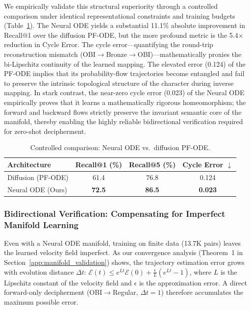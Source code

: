 \documentclass{article}
\begin{document}
We empirically validate this structural superiority through a controlled comparison under identical representational constraints and training budgets (Table~\ref{tab:pre:ode_comp}). The Neural ODE yields a substantial 11.1\% absolute improvement in Recall@1 over the diffusion PF-ODE, but the more profound metric is the 5.4$\times$ reduction in Cycle Error. The cycle error—quantifying the round-trip reconstruction mismatch (OBI$\to$Bronze$\to$OBI)—mathematically proxies the bi-Lipschitz continuity of the learned mapping. The elevated error (0.124) of the PF-ODE implies that its probability-flow trajectories become entangled and fail to preserve the intrinsic topological structure of the character during inverse mapping. In stark contrast, the near-zero cycle error (0.023) of the Neural ODE empirically proves that it learns a mathematically rigorous homeomorphism; the forward and backward flows strictly preserve the invariant semantic core of the manifold, thereby enabling the highly reliable bidirectional verification required for zero-shot decipherment.

\begin{table}[h]
  \centering
  \caption{Controlled comparison: Neural ODE vs.\ diffusion PF-ODE.}
  \label{tab:pre:ode_comp}
  \begin{tabular}{lccc}
    \toprule
    \textbf{Architecture} &
    \textbf{Recall@1 (\%)} &
    \textbf{Recall@5 (\%)} &
    \textbf{Cycle Error $\downarrow$} \\
    \midrule
    Diffusion (PF-ODE) & 61.4 & 76.8 & 0.124 \\
    Neural ODE (Ours)  & \textbf{72.5} & \textbf{86.5} & \textbf{0.023} \\
    \bottomrule
  \end{tabular}
\end{table}

\subsubsection{Bidirectional Verification: Compensating for Imperfect Manifold Learning}
\label{sec:pre:s14}

Even with a Neural ODE manifold, training on finite data (13.7K pairs) leaves
the learned velocity field imperfect.
As our convergence analysis (Theorem~1 in Section~\ref{app:manifold_validation}) shows, the
trajectory estimation error grows with evolution distance $\Delta t$:
$\mathcal{E}(t) \leq e^{Lt}\mathcal{E}(0) + \frac{\epsilon}{L}(e^{Lt}-1)$,
where $L$ is the Lipschitz constant of the velocity field and $\epsilon$ is the
approximation error.
A direct forward-only decipherment (OBI$\to$Regular, $\Delta t = 1$) therefore
accumulates the maximum possible error.
\end{document}
